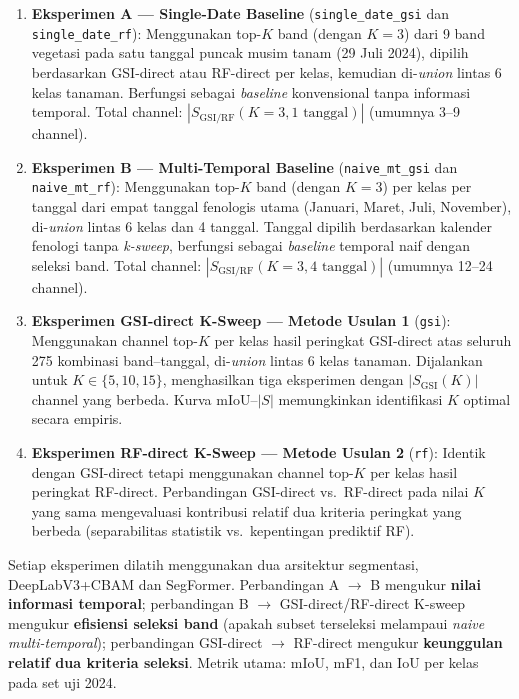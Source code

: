 \begin{enumerate}
    \item \textbf{Eksperimen A — Single-Date Baseline} (\texttt{single\_date\_gsi} dan \texttt{single\_date\_rf}):
    Menggunakan top-$K$ band (dengan $K=3$) dari 9 band vegetasi pada satu tanggal puncak musim tanam (29 Juli 2024), dipilih berdasarkan GSI-direct atau RF-direct per kelas, kemudian di-\textit{union} lintas 6 kelas tanaman.
    Berfungsi sebagai \textit{baseline} konvensional tanpa informasi temporal.
    Total channel: $|S_{\text{GSI/RF}}(K=3, 1 \text{ tanggal})|$ (umumnya 3--9 channel).

    \item \textbf{Eksperimen B — Multi-Temporal Baseline} (\texttt{naive\_mt\_gsi} dan \texttt{naive\_mt\_rf}):
    Menggunakan top-$K$ band (dengan $K=3$) per kelas per tanggal dari empat tanggal fenologis utama (Januari, Maret, Juli, November), di-\textit{union} lintas 6 kelas dan 4 tanggal.
    Tanggal dipilih berdasarkan kalender fenologi tanpa \textit{k-sweep}, berfungsi sebagai \textit{baseline} temporal naif dengan seleksi band.
    Total channel: $|S_{\text{GSI/RF}}(K=3, 4 \text{ tanggal})|$ (umumnya 12--24 channel).

    \item \textbf{Eksperimen GSI-direct K-Sweep — Metode Usulan 1} (\texttt{gsi}):
    Menggunakan channel top-$K$ per kelas hasil peringkat GSI-direct atas seluruh 275 kombinasi band--tanggal, di-\textit{union} lintas 6 kelas tanaman.
    Dijalankan untuk $K \in \{5, 10, 15\}$, menghasilkan tiga eksperimen dengan $|S_{\text{GSI}}(K)|$ channel yang berbeda.
    Kurva mIoU--$|S|$ memungkinkan identifikasi $K$ optimal secara empiris.

    \item \textbf{Eksperimen RF-direct K-Sweep — Metode Usulan 2} (\texttt{rf}):
    Identik dengan GSI-direct tetapi menggunakan channel top-$K$ per kelas hasil peringkat RF-direct.
    Perbandingan GSI-direct vs.\ RF-direct pada nilai $K$ yang sama mengevaluasi kontribusi relatif dua kriteria peringkat yang berbeda (separabilitas statistik vs.\ kepentingan prediktif RF).
\end{enumerate}

Setiap eksperimen dilatih menggunakan dua arsitektur segmentasi, DeepLabV3+CBAM dan SegFormer.
Perbandingan A $\to$ B mengukur \textbf{nilai informasi temporal}; perbandingan B $\to$ GSI-direct/RF-direct K-sweep mengukur \textbf{efisiensi seleksi band} (apakah subset terseleksi melampaui \textit{naive multi-temporal}); perbandingan GSI-direct $\to$ RF-direct mengukur \textbf{keunggulan relatif dua kriteria seleksi}.
Metrik utama: mIoU, mF1, dan IoU per kelas pada set uji 2024.

